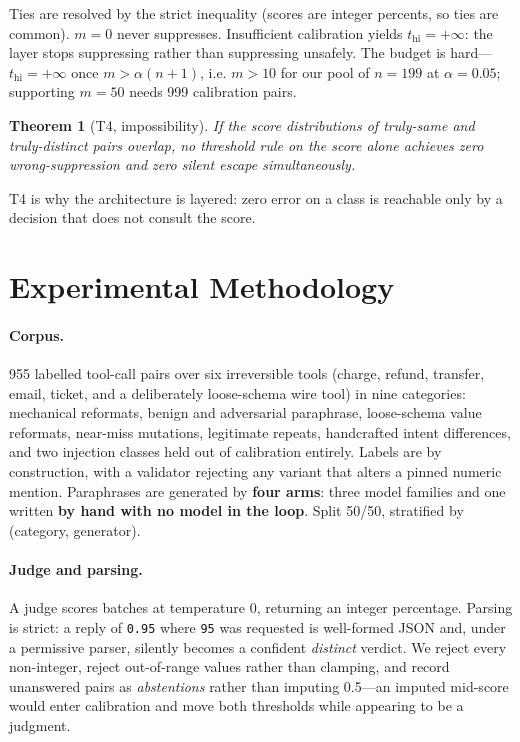\documentclass[10pt,twocolumn]{article}
\newtheorem{theorem}{Theorem}
\theoremstyle{definition}
\theoremstyle{remark}
\newcommand{\thi}{t_{\mathrm{hi}}}
\begin{document}
Ties are resolved by the strict inequality (scores are integer percents, so ties
are common). $m=0$ never suppresses. Insufficient calibration yields
$\thi=+\infty$: the layer stops suppressing rather than suppressing unsafely.
The budget is hard---$\thi=+\infty$ once $m > \alpha(n{+}1)$, i.e. $m>10$ for our
pool of $n{=}199$ at $\alpha{=}0.05$; supporting $m{=}50$ needs 999 calibration
pairs.

\begin{theorem}[T4, impossibility]
If the score distributions of truly-same and truly-distinct pairs overlap, no
threshold rule on the score alone achieves zero wrong-suppression and zero silent
escape simultaneously.
\end{theorem}

T4 is why the architecture is layered: zero error on a class is reachable only by
a decision that does not consult the score.

\section{Experimental Methodology}
\label{sec:eval}

\paragraph{Corpus.} 955 labelled tool-call pairs over six irreversible tools
(charge, refund, transfer, email, ticket, and a deliberately loose-schema wire
tool) in nine categories: mechanical reformats, benign and adversarial
paraphrase, loose-schema value reformats, near-miss mutations, legitimate
repeats, handcrafted intent differences, and two injection classes held out of
calibration entirely. Labels are by construction, with a validator rejecting any
variant that alters a pinned numeric mention. Paraphrases are generated by
\textbf{four arms}: three model families and one written \textbf{by hand with no
model in the loop}. Split 50/50, stratified by (category, generator).

\paragraph{Judge and parsing.} A judge scores batches at temperature 0, returning
an integer percentage. Parsing is strict: a reply of \texttt{0.95} where
\texttt{95} was requested is well-formed JSON and, under a permissive parser,
silently becomes a confident \emph{distinct} verdict. We reject every
non-integer, reject out-of-range values rather than clamping, and record
unanswered pairs as \emph{abstentions} rather than imputing 0.5---an imputed
mid-score would enter calibration and move both thresholds while appearing to be
a judgment.
\end{document}
